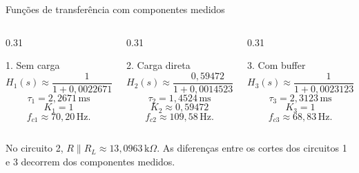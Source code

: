 \begin{frame}{Funções de transferência com componentes medidos}
  \small
  \begin{columns}[T,onlytextwidth]
    \begin{column}{0.31\textwidth}
      \begin{block}{1. Sem carga}
        \[
          H_1(s)\approx\frac{1}{1+0{,}00226710s}.
        \]
        \[
          \tau_1=2{,}2671\,\mathrm{ms}
        \]
        \[
          K_1=1
        \]
        \[
          f_{c1}\approx70{,}20\,\mathrm{Hz}.
        \]
      \end{block}
    \end{column}
    \begin{column}{0.31\textwidth}
      \begin{block}{2. Carga direta}
        \[
          H_2(s)\approx\frac{0{,}59472}{1+0{,}00145238s}.
        \]
        \[
          \tau_2=1{,}4524\,\mathrm{ms}
        \]
        \[
          K_2\approx0{,}59472
        \]
        \[
          f_{c2}\approx109{,}58\,\mathrm{Hz}.
        \]
      \end{block}
    \end{column}
    \begin{column}{0.31\textwidth}
      \begin{block}{3. Com buffer}
        \[
          H_3(s)\approx\frac{1}{1+0{,}00231233s}.
        \]
        \[
          \tau_3=2{,}3123\,\mathrm{ms}
        \]
        \[
          K_3=1
        \]
        \[
          f_{c3}\approx68{,}83\,\mathrm{Hz}.
        \]
      \end{block}
    \end{column}
  \end{columns}

  \vspace{0.12cm}
  \centering\scriptsize
  No circuito 2, $R\parallel R_L\approx13{,}0963\,\mathrm{k}\Omega$.
  As diferenças entre os cortes dos circuitos 1 e 3 decorrem dos componentes medidos.
\end{frame}
